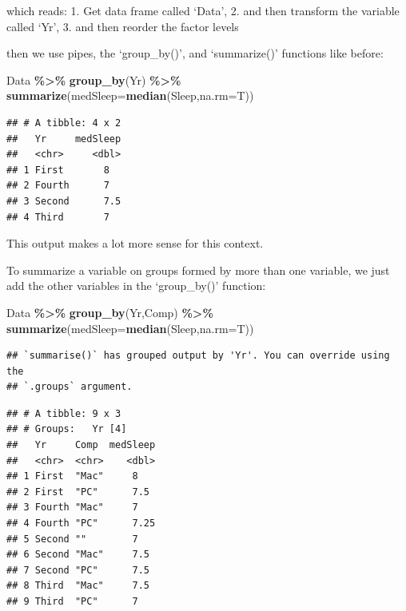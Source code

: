 \documentclass[
  openany]{book}
\newenvironment{Shaded}{\begin{snugshade}}{\end{snugshade}}
\newcommand{\AttributeTok}[1]{\textcolor[rgb]{0.13,0.29,0.53}{#1}}
\newcommand{\FunctionTok}[1]{\textcolor[rgb]{0.13,0.29,0.53}{\textbf{#1}}}
\newcommand{\NormalTok}[1]{#1}
\newcommand{\SpecialCharTok}[1]{\textcolor[rgb]{0.81,0.36,0.00}{\textbf{#1}}}
\begin{document}
which reads:
1. Get data frame called `Data',
2. and then transform the variable called `Yr',
3. and then reorder the factor levels

then we use pipes, the `group\_by()', and `summarize()' functions like before:

\begin{Shaded}
\begin{Highlighting}[]
\NormalTok{Data }\SpecialCharTok{\%\textgreater{}\%} 
  \FunctionTok{group\_by}\NormalTok{(Yr) }\SpecialCharTok{\%\textgreater{}\%} 
  \FunctionTok{summarize}\NormalTok{(}\AttributeTok{medSleep=}\FunctionTok{median}\NormalTok{(Sleep,}\AttributeTok{na.rm=}\NormalTok{T))}
\end{Highlighting}
\end{Shaded}

\begin{verbatim}
## # A tibble: 4 x 2
##   Yr     medSleep
##   <chr>     <dbl>
## 1 First       8  
## 2 Fourth      7  
## 3 Second      7.5
## 4 Third       7
\end{verbatim}

This output makes a lot more sense for this context.

To summarize a variable on groups formed by more than one variable, we just add the other variables in the `group\_by()' function:

\begin{Shaded}
\begin{Highlighting}[]
\NormalTok{Data }\SpecialCharTok{\%\textgreater{}\%} 
  \FunctionTok{group\_by}\NormalTok{(Yr,Comp) }\SpecialCharTok{\%\textgreater{}\%} 
  \FunctionTok{summarize}\NormalTok{(}\AttributeTok{medSleep=}\FunctionTok{median}\NormalTok{(Sleep,}\AttributeTok{na.rm=}\NormalTok{T))}
\end{Highlighting}
\end{Shaded}

\begin{verbatim}
## `summarise()` has grouped output by 'Yr'. You can override using the
## `.groups` argument.
\end{verbatim}

\begin{verbatim}
## # A tibble: 9 x 3
## # Groups:   Yr [4]
##   Yr     Comp  medSleep
##   <chr>  <chr>    <dbl>
## 1 First  "Mac"     8   
## 2 First  "PC"      7.5 
## 3 Fourth "Mac"     7   
## 4 Fourth "PC"      7.25
## 5 Second ""        7   
## 6 Second "Mac"     7.5 
## 7 Second "PC"      7.5 
## 8 Third  "Mac"     7.5 
## 9 Third  "PC"      7
\end{verbatim}
\end{document}
